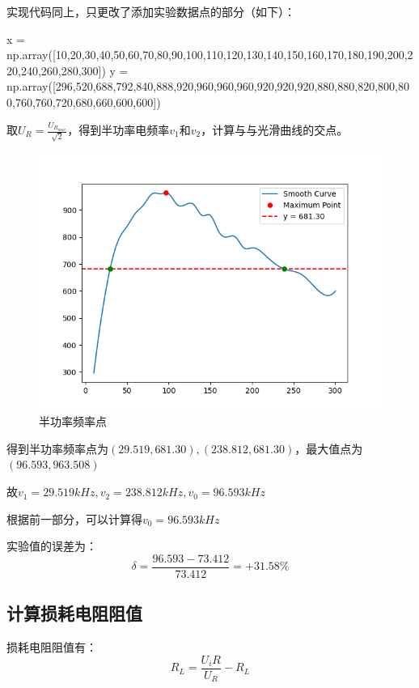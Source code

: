 \documentclass{article}
\begin{document}
实现代码同上，只更改了添加实验数据点的部分（如下）：
\begin{python}
x = np.array([10,20,30,40,50,60,70,80,90,100,110,120,130,140,150,160,170,180,190,200,220,240,260,280,300])
y = np.array([296,520,688,792,840,888,920,960,960,960,920,920,920,880,880,820,800,800,760,760,720,680,660,600,600])
\end{python}

取$U_R = \frac{U_{R_{max}}}{\sqrt{2}}$，得到半功率电频率$v_1$和$v_2$，计算与与光滑曲线的交点。
\begin{figure}[htbp]
    \centering
    \includegraphics[width=1.0\textwidth]{2-3.png}
    \caption{半功率频率点}
\end{figure}

得到半功率频率点为$(29.519, 681.30), (238.812, 681.30)$，最大值点为$(96.593, 963.508)$

故$v_1 = 29.519 kHz, v_2 = 238.812 kHz, v_0 = 96.593 kHz$

根据前一部分，可以计算得$v_0 = 96.593 kHz$

实验值的误差为：
\begin{equation*}
    \delta = \frac{96.593 - 73.412}{73.412} = +31.58\%
\end{equation*}

\subsection{计算损耗电阻阻值}
损耗电阻阻值有：
\begin{equation*}
    R_L = \frac{U_i R}{U_R} - R_L
\end{equation*}
\end{document}
